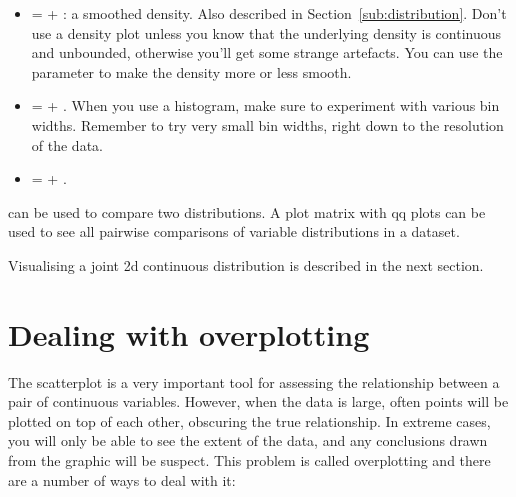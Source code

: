 \begin{itemize}
  \item {} =  + : a smoothed density.  Also described in Section~\ref{sub:distribution}.  Don't use a density plot unless you know that the underlying density is continuous and unbounded, otherwise you'll get some strange artefacts. You can use the  parameter to make the density more or less smooth.
  
    

  \item {} =  + .  When you use a histogram, make sure to experiment with various bin widths.  Remember to try very small bin widths, right down to the resolution of the data.  
  
  \item {} =  + .  
\end{itemize}

 can be used to compare two distributions.  A plot matrix with qq plots can be used to see all pairwise comparisons of variable distributions in a dataset.

Visualising a joint 2d continuous distribution is described in the next section.

\section{Dealing with overplotting}
\label{sec:overplotting}

The scatterplot is a very important tool for assessing the relationship between a pair of continuous variables.  However, when the data is large, often points will be plotted on top of each other, obscuring the true relationship.  In extreme cases, you will only be able to see the extent of the data, and any conclusions drawn from the graphic will be suspect.  This problem is called overplotting and there are a number of ways to deal with it:

